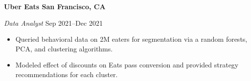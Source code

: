\textbf{Uber Eats \hfill  San Francisco, CA} \par
\textit{Data Analyst} \hfill Sep 2021--Dec 2021 \par
\begin{itemize}
	\item Queried behavioral data on 2M eaters for segmentation via a random forests, PCA, and clustering algorithms.
	\item Modeled effect of discounts on Eats pass conversion and provided strategy recommendations for each cluster.
\end{itemize} \par